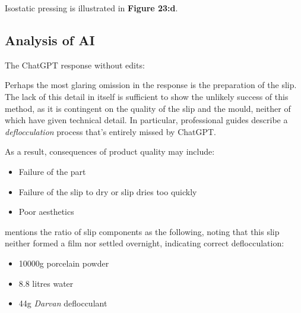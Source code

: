 \documentclass[../main.tex]{subfiles}
\begin{document}
Isostatic pressing is illustrated in \textbf{Figure 23:d}.
\newpage

\subsection{Analysis of AI}
The ChatGPT response without edits:

\vskip 1cm

Perhaps the most glaring omission in the response is the preparation of the slip.
The lack of this detail in itself is sufficient to show the unlikely success of this method, as it is contingent on the quality of the slip and the mould, neither of which have given technical detail.
In particular, professional guides describe a \textit{deflocculation} process that's entirely missed by ChatGPT.

As a result, consequences of product quality may include:
\begin{itemize}
	\item Failure of the part
	\item Failure of the slip to dry or slip dries too quickly
	\item Poor aesthetics
\end{itemize}

\textcite{slipcast2} mentions the ratio of slip components as the following, noting that this slip neither formed a film nor settled overnight, indicating correct deflocculation:
\begin{itemize}
	\item 10000g porcelain powder
	\item 8.8 litres water
	\item 44g \textit{Darvan} deflocculant
\end{itemize}
\end{document}
